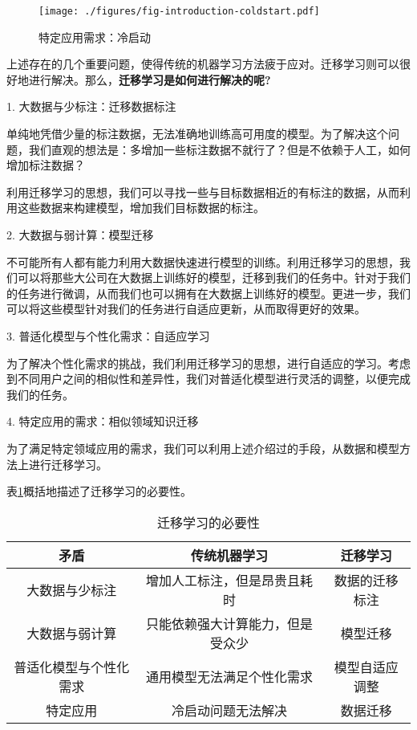 \begin{figure}[htbp]
	\centering
	\texttt{[image: ./figures/fig-introduction-coldstart.pdf]}
	\caption{特定应用需求：冷启动}
	\label{fig-coldstart}
\end{figure}

上述存在的几个重要问题，使得传统的机器学习方法疲于应对。迁移学习则可以很好地进行解决。那么，\textbf{迁移学习是如何进行解决的呢?}

1. 大数据与少标注：迁移数据标注

单纯地凭借少量的标注数据，无法准确地训练高可用度的模型。为了解决这个问题，我们直观的想法是：多增加一些标注数据不就行了？但是不依赖于人工，如何增加标注数据？

利用迁移学习的思想，我们可以寻找一些与目标数据相近的有标注的数据，从而利用这些数据来构建模型，增加我们目标数据的标注。

2. 大数据与弱计算：模型迁移

不可能所有人都有能力利用大数据快速进行模型的训练。利用迁移学习的思想，我们可以将那些大公司在大数据上训练好的模型，迁移到我们的任务中。针对于我们的任务进行微调，从而我们也可以拥有在大数据上训练好的模型。更进一步，我们可以将这些模型针对我们的任务进行自适应更新，从而取得更好的效果。

3. 普适化模型与个性化需求：自适应学习

为了解决个性化需求的挑战，我们利用迁移学习的思想，进行自适应的学习。考虑到不同用户之间的相似性和差异性，我们对普适化模型进行灵活的调整，以便完成我们的任务。

4. 特定应用的需求：相似领域知识迁移

为了满足特定领域应用的需求，我们可以利用上述介绍过的手段，从数据和模型方法上进行迁移学习。

表\ref{tb-whytransfer}概括地描述了迁移学习的必要性。

\begin{table}[htbp]
	\centering
	\caption{迁移学习的必要性}
	\label{tb-whytransfer}
	\begin{tabular}{|c|c|c|}
		\hline
		\textbf{矛盾} & \textbf{传统机器学习} & \textbf{迁移学习} \\ \hline
		大数据与少标注 & 增加人工标注，但是昂贵且耗时 & 数据的迁移标注 \\ \hline
		大数据与弱计算 & 只能依赖强大计算能力，但是受众少 & 模型迁移 \\ \hline
		普适化模型与个性化需求 & 通用模型无法满足个性化需求 & 模型自适应调整 \\ \hline
		特定应用 & 冷启动问题无法解决 & 数据迁移 \\ \hline
	\end{tabular}
\end{table}

